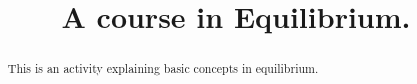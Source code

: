 \documentclass{xourse}
\title{A course in Equilibrium.}
\begin{document}
  
\begin{abstract} %
This is an activity explaining basic concepts in equilibrium.  
\end{abstract}  
\maketitle  
 
 
\end{document}
